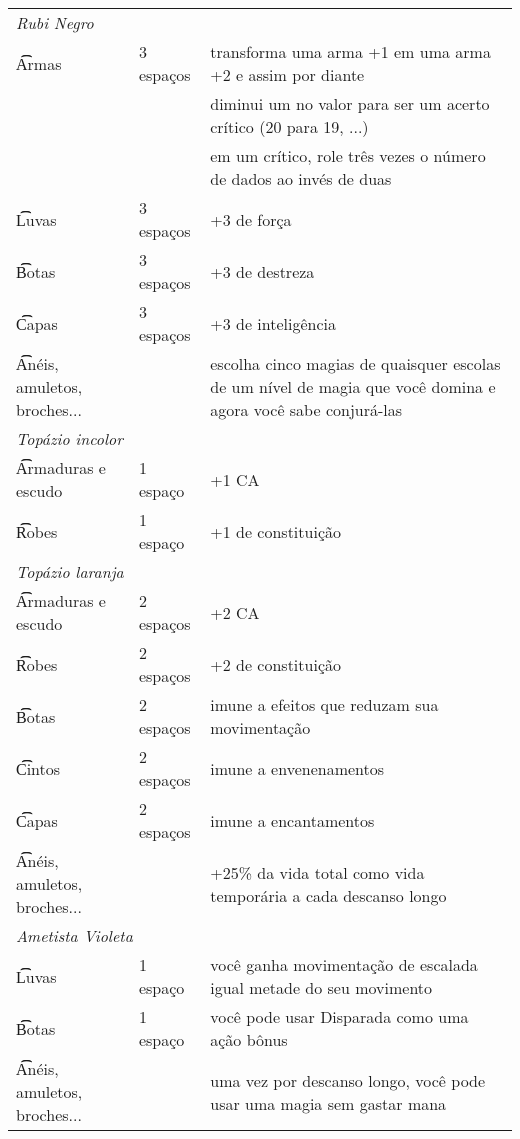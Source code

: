 \documentclass{RPG_Adventure}[2021/10/20]
\begin{document}
\begin{center}
\begin{longtable}{ m{6cm} m{2cm} m{8cm} }
    \multicolumn{2}{l}{\t\textit{Rubi Negro}} \\
    \t\t Armas & 3 espaços & transforma uma arma +1 em uma arma +2 e assim por
    diante\\&& diminui um no valor para ser um acerto crítico (20 para 19, ...)
    \\&&em um crítico, role três vezes o número de dados ao invés de duas\\
    \hline
    \t\t Luvas & 3 espaços & +3 de força \\ \hline
    \t\t Botas & 3 espaços & +3 de destreza \\ \hline
    \t\t Capas & 3 espaços & +3 de inteligência \\ \hline
    \t\t Anéis, amuletos, broches... && escolha cinco magias de quaisquer
    escolas de um nível de magia que você domina e agora você sabe
    conjurá-las \\

    \hline \hline \hline \hline

    \multicolumn{2}{l}{\t\textit{Topázio incolor}} \\
    \t\t Armaduras e escudo & 1 espaço & +1 CA \\ \hline
    \t\t Robes & 1 espaço & +1 de constituição \\
    \hline \hline

    \multicolumn{2}{l}{\t\textit{Topázio laranja}} \\
    \t\t Armaduras e escudo & 2 espaços & +2 CA \\ \hline
    \t\t Robes & 2 espaços & +2 de constituição \\ \hline
    \t\t Botas & 2 espaços & imune a efeitos que reduzam sua movimentação \\ \hline
    \t\t Cintos & 2 espaços & imune a envenenamentos \\ \hline
    \t\t Capas & 2 espaços & imune a encantamentos \\ \hline
    \t\t Anéis, amuletos, broches... && +25\% da vida total como vida temporária
    a cada descanso longo \\
    \hline \hline

    \hline \hline \hline \hline

    \multicolumn{2}{l}{\t\textit{Ametista Violeta}} \\
    \t\t Luvas & 1 espaço & você ganha movimentação de escalada igual
    metade do seu movimento \\ \hline
    \t\t Botas & 1 espaço & você pode usar Disparada como uma ação bônus \\
    \hline
    \t\t Anéis, amuletos, broches... && uma vez por descanso longo,
    você pode usar uma magia sem gastar mana \\
    \hline \hline


\end{longtable}
\end{center}
\end{document}

